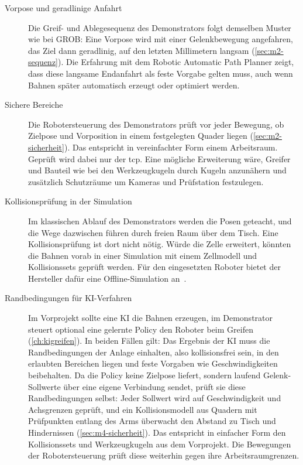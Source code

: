 \begin{description}
  \item[Vorpose und geradlinige Anfahrt] Die Greif- und Ablegesequenz des Demonstrators folgt
    demselben Muster wie bei GROB: Eine Vorpose wird mit einer Gelenkbewegung angefahren, das
    Ziel dann geradlinig, auf den letzten Millimetern langsam (\cref{sec:m2-sequenz}). Die
    Erfahrung mit dem Robotic Automatic Path Planner zeigt, dass diese langsame Endanfahrt als
    feste Vorgabe gelten muss, auch wenn Bahnen später automatisch erzeugt oder optimiert
    werden.
  \item[Sichere Bereiche] Die Robotersteuerung des Demonstrators prüft vor jeder Bewegung,
    ob Zielpose und Vorposition in einem festgelegten Quader liegen (\cref{sec:m2-sicherheit}).
    Das entspricht in vereinfachter Form einem Arbeitsraum. Geprüft wird dabei nur der \ac{tcp}.
    Eine mögliche Erweiterung wäre, Greifer und Bauteil wie bei den Werkzeugkugeln durch Kugeln
    anzunähern und zusätzlich Schutzräume um Kameras und Prüfstation festzulegen.
  \item[Kollisionsprüfung in der Simulation] Im klassischen Ablauf des Demonstrators werden die
    Posen geteacht, und die Wege dazwischen führen durch freien Raum über dem Tisch. Eine
    Kollisionsprüfung ist dort nicht nötig. Würde die Zelle erweitert, könnten die Bahnen vorab
    in einer Simulation mit einem Zellmodell und Kollisionssets geprüft werden. Für den
    eingesetzten Roboter bietet der Hersteller dafür eine Offline-Simulation
    an~\cite{neura2024offlinesim}.
  \item[Randbedingungen für KI-Verfahren] Im Vorprojekt sollte eine KI die Bahnen erzeugen, im
    Demonstrator steuert optional eine gelernte Policy den Roboter beim Greifen
    (\cref{ch:kigreifen}). In beiden Fällen gilt: Das Ergebnis der KI muss die
    Randbedingungen der Anlage einhalten, also kollisionsfrei sein, in den erlaubten Bereichen
    liegen und feste Vorgaben wie Geschwindigkeiten beibehalten. Da die Policy keine Zielpose
    liefert, sondern laufend Gelenk-Sollwerte über eine eigene Verbindung sendet, prüft sie
    diese Randbedingungen selbst: Jeder Sollwert wird auf Geschwindigkeit und Achsgrenzen
    geprüft, und ein Kollisionsmodell aus Quadern mit Prüfpunkten entlang des Arms überwacht
    den Abstand zu Tisch und Hindernissen (\cref{sec:m4-sicherheit}). Das entspricht in
    einfacher Form den Kollisionssets und Werkzeugkugeln aus dem Vorprojekt. Die Bewegungen der
    Robotersteuerung prüft diese weiterhin gegen ihre Arbeitsraumgrenzen.
\end{description}
